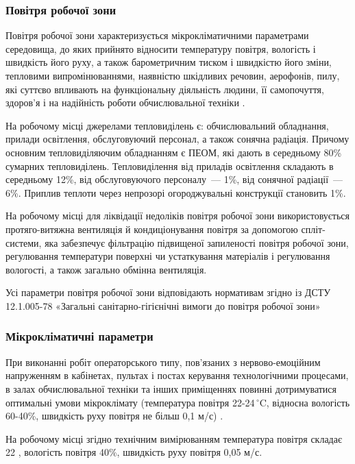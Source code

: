 \documentclass[a4paper,ukrainian,utf8,nocolumnsxix,nocolumnxxxii,nocolumnxxxi,floatsection,equationsection]{eskdtext}
\renewcommand\paragraph{\subsubsection}
\begin{document}
\paragraph{Повітря робочої зони}

Повітря робочої зони характеризується мікрокліматичними параметрами середовища, до яких прийнято відносити температуру повітря, вологість і швидкість його руху, а також барометричним тиском і швидкістю його зміни, тепловими випромінюваннями, наявністю шкідливих речовин, аерофонів, пилу, які суттєво впливають на функціональну діяльність людини, її самопочуття, здоров'я і на надійність роботи обчислювальної техніки \cite{work:safety:17}. 

На робочому місці джерелами тепловиділень є: обчислювальний обладнання, прилади освітлення, обслуговуючий персонал, а також сонячна радіація. Причому основним тепловиділяючим обладнанням є ПЕОМ, які дають в середньому 80\% сумарних тепловиділень. Тепловиділення від приладів освітлення складають в середньому 12\%, від обслуговуючого персоналу~--- 1\%, від сонячної радіації~--- 6\%. Приплив теплоти через непрозорі огороджувальні конструкції становить 1\%.

На робочому місці для ліквідації недоліків повітря робочої зони використовується протяго-витяжна вентиляція й кондиціонування повітря за допомогою спліт-системи, яка забезпечує фільтрацію підвищеної запиленості повітря робочої зони, регулювання температури поверхні чи устаткування матеріалів і регулювання вологості, а також загально обмінна вентиляція.

Усі параметри повітря робочої зони відповідають нормативам згідно із  ДСТУ 12.1.005-78 «Загальні санітарно-гігієнічні вимоги до повітря робочої зони»

\paragraph{Мікрокліматичні параметри}

При виконанні робіт операторського типу, пов'язаних з нервово-емоційним напруженням в кабінетах, пультах і постах керування технологічними процесами, в залах обчислювальної техніки та інших приміщеннях повинні дотримуватися оптимальні умови мікроклімату (температура повітря 22-24$\,^{\circ}\mathrm{C}$, відносна вологість 60-40\%, швидкість руху повітря не більш 0,1 м/с) \cite{work:safety:17}.

На робочому місці згідно технічним вимірюванням температура повітря складає 22 , вологість повітря 40\%, швидкість руху повітря 0,05 м/с.
\end{document}
